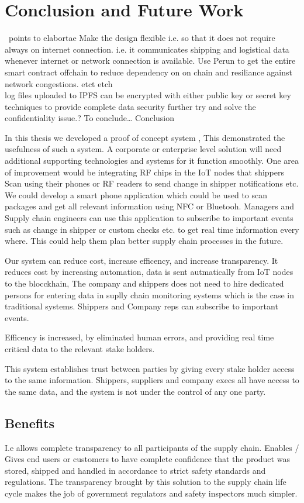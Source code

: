 \section{Conclusion and Future Work}
\ points to elabortae
Make the design flexible i.e. so that it does not require always on internet connection.
i.e. it communicates shipping and logistical data whenever internet or network connection is available.
Use Perun to get the entire smart contract offchain to reduce dependency on on chain and resiliance against network congestions.
etct etch
\\ log files uploaded to IPFS can be encrypted with either public key or secret key techniques to provide complete data security 
further try and solve the confidentiality issue.?
To conclude\ldots
Conclusion

In this thesis we developed a proof of concept system , This demonstrated the usefulness of such a system. A corporate or enterprise level solution will need additional supporting technologies and systems for it function smoothly. One area of improvement would be integrating RF chips in the IoT nodes that shippers Scan using their phones or RF readers to send change in shipper notifications etc. We could develop a smart phone application which could be used to scan packages and get all relevant information using NFC or Bluetooh. Managers and Supply chain engineers can use this application to subscribe to important events such as change in shipper or custom checks etc. to get real time information every where. This could help them plan better supply chain processes in the future.


Our system can reduce cost, increase efficency, and increase transparency. It reduces cost by increasing automation, data is sent autmatically from IoT nodes to the blocckhain,   The company and shippers does not need to hire dedicated persons for entering data in suplly chain monitoring systems which is the case in traditional systems. Shippers and Company reps can subscribe to important events.

Efficency is increased, by eliminated human errors, and providing real time critical data to the relevant stake holders. 

This system establishes trust between parties by giving every stake holder access to the same information. Shippers, suppliers and company execs all have access to the same data, and the system is not under the control of any one party.



\subsection{Benefits}
I.e allows complete transparency to all participants of the supply chain. Enables / Gives end users or customers to have complete confidence that the product was stored, shipped and handled in accordance to strict safety standards and regulations. The transparency brought by this solution to  the supply chain life cycle makes the job of government regulators and safety inspectors much simpler.

